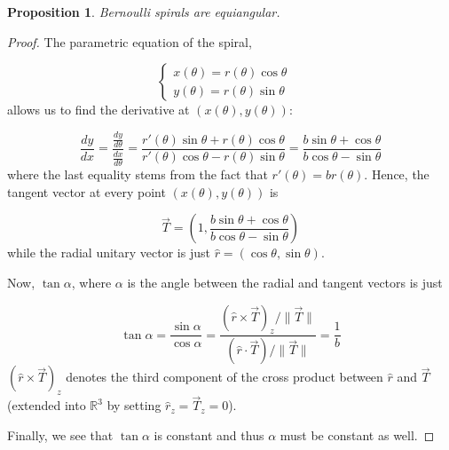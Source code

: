 \documentclass{article}
\theoremstyle{theorem}
\newtheorem{prop}{Proposition}[section]
\theoremstyle{theorem}
\begin{document}
\begin{prop}
  \label{prop:equiangular}
  Bernoulli spirals are equiangular.
\end{prop}

\begin{proof}


  The parametric equation of the spiral,

\begin{equation}
  \left \lbrace
    \begin{array}{l}
      x(\theta)=r(\theta) \cos \theta \\
      y(\theta)=r(\theta) \sin \theta
    \end{array}
  \right. \quad
\end{equation}
allows us to find the derivative at $\left(x(\theta),
  y(\theta)\right)$:

\begin{equation}
  \frac{dy}{dx}
=\frac{\frac{dy}{d\theta}}{\frac{dx}{d\theta}}
=\frac{r'(\theta)\sin\theta+r(\theta)\cos\theta}{r'(\theta)\cos\theta-r(\theta)\sin\theta}
=\frac{b\sin\theta+\cos\theta}{b\cos\theta-\sin\theta}
\end{equation}
where the last equality stems from the fact that $r'(\theta)=b r(\theta)$.
Hence, the tangent vector at every point $\left(x(\theta),y(\theta)\right)$ is

\begin{equation}
  \vec{T}=\left(1, \frac{b\sin\theta+\cos\theta}{b\cos\theta-\sin\theta}\right)
\end{equation}
while the radial unitary vector is just
$\hat{r}=(\cos\theta,\sin\theta)$.



Now, $\tan\alpha$, where $\alpha$ is the angle between the radial and
tangent vectors is just

\begin{equation}
  \tan\alpha
  =\frac{\sin\alpha}{\cos\alpha}
  =\frac{\left(\hat{r}\times\vec{T}\right)_z/\|\vec{T}\|}{\left(\hat{r}\cdot\vec{T}\right)/\|\vec{T}\|}
  =\frac{1}{b}
\end{equation}
$\left(\hat{r}\times\vec{T}\right)_z$ denotes the third component
of the cross product between $\hat{r}$ and $\vec{T}$ (extended into
$\mathbb{R}^3$ by setting $\hat{r}_z=\vec{T}_z=0$).

Finally, we see that $\tan\alpha$ is constant and thus $\alpha$ must be
constant as well.

\end{proof}
\end{document}
